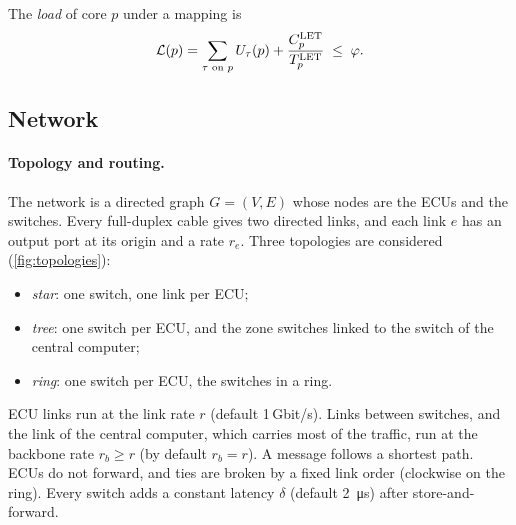 The \emph{load} of core $p$ under a mapping is
\begin{equation}
\mathcal{L}(p)=\sum_{\tau\text{ on }p} U_\tau(p) + \frac{C^{\mathrm{LET}}_p}{T^{\mathrm{LET}}_p}
\;\le\;\varphi .
\label{eq:load}
\end{equation}

\subsection{Network}
\label{sec:network-model}

\paragraph{Topology and routing.} The network is a directed graph $G=(V,E)$
whose nodes are the ECUs and the switches. Every full-duplex cable gives
two directed links, and each link $e$ has an output port at its origin and
a rate $r_e$. Three topologies are considered (\cref{fig:topologies}):
\begin{itemize}
\item \emph{star}: one switch, one link per ECU;
\item \emph{tree}: one switch per ECU, and the zone switches linked to the
switch of the central computer;
\item \emph{ring}: one switch per ECU, the switches in a ring.
\end{itemize}
ECU links run at the link rate $r$ (default 1\,Gbit/s). Links between
switches, and the link of the central computer, which carries most of the
traffic, run at the backbone rate $r_b\ge r$ (by default $r_b=r$). A
message follows a shortest path. ECUs do not forward, and ties are broken
by a fixed link order (clockwise on the ring). Every switch adds a
constant latency $\delta$ (default \SI{2}{\micro s}) after
store-and-forward.

